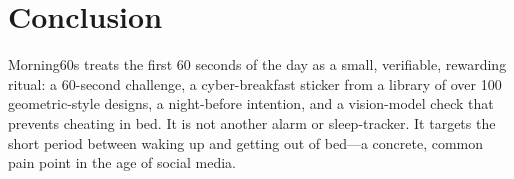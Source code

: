 \documentclass[manuscript,anonymous,review]{acmart}
\begin{document}
\section{Conclusion}
Morning60s treats the first 60 seconds of the day as a small, verifiable, rewarding ritual: a 60-second challenge, a cyber-breakfast sticker from a library of over 100 geometric-style designs, a night-before intention, and a vision-model check that prevents cheating in bed. It is not another alarm or sleep-tracker. It targets the short period between waking up and getting out of bed---a concrete, common pain point in the age of social media.
\end{document}
